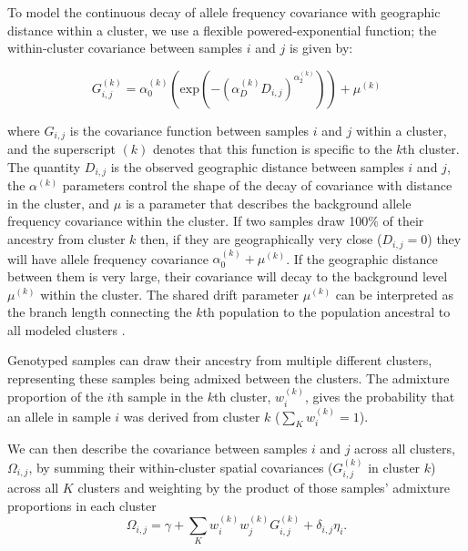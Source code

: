 \documentclass[12pt]{article}
\newcommand{\gb}[1]{{\it\color{magenta}{(#1)}}}
\newcommand{\gc}[1]{{\it\color{blue}{(#1)}}}
\begin{document}
To model the continuous decay of allele frequency covariance with geographic distance within a cluster, 
we use a flexible powered-exponential function;
the within-cluster covariance between samples $i$ and $j$ is given by:

\begin{equation}
G^{(k)}_{i,j} = \alpha^{(k)}_0 \left( \text{exp} \left( -(\alpha^{(k)}_D D_{i,j}) ^ {\alpha^{(k)}_2}	\right) \right) + \mu^{(k)}
\label{within_cluster_covariance}
\end{equation}

where $G_{i,j}$ is the covariance function between samples $i$ and $j$ within a cluster,
and the superscript $(k)$ denotes that this function is specific to the $k$th cluster.
The quantity $D_{i,j}$ is the observed geographic distance between samples $i$ and $j$,
the $\alpha^{(k)}$ parameters control the shape of the decay of covariance with distance in the cluster,
and $\mu$ is a parameter that describes the background allele frequency covariance within the cluster. 
If two samples draw 100\% of their ancestry from cluster $k$ then, 
if they are geographically very close ($D_{i,j}=0$) 
they will have allele frequency covariance $\alpha^{(k)}_0 +  \mu^{(k)}$.
If the geographic distance between them is very large, 
their covariance will decay to the background level $\mu^{(k)}$ within the cluster.
The shared drift parameter $\mu^{(k)}$ can be interpreted as the branch length 
connecting the $k$th population to the population ancestral to all modeled
clusters \gc{(see XXX)}. \gb{is ``XXX" TreeMix? or one of the $f$stat papers?  or is it a figure?} 

Genotyped samples can draw their ancestry from multiple different clusters,
representing these samples being admixed between the clusters.
The admixture proportion of the $i$th sample in the $k$th cluster, $w^{(k)}_i$,
gives the probability that an allele in sample $i$ was derived from
cluster $k$ ($\sum_K w^{(k)}_i =1$).

We can then describe the covariance between samples $i$ and $j$ across all clusters, $\Omega_{i,j}$,
by summing their within-cluster spatial covariances ($G_{i,j}^{(k)}$ in cluster $k$) across all $K$ clusters
and weighting by the product of those samples' admixture proportions in each cluster
\begin{equation}
\Omega_{i,j} = \gamma + \sum\limits_K w^{(k)}_i w^{(k)}_j
G^{(k)}_{i,j} + \delta_{i,j}\eta_i .
\label{cross_cluster_covariance}
\end{equation}
\end{document}
